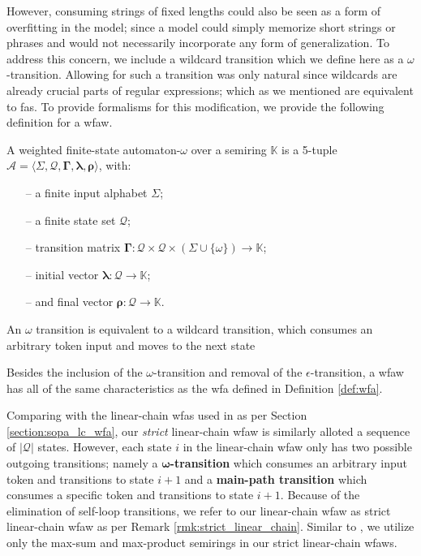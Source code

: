 However, consuming strings of fixed lengths could also be seen as a form of
overfitting in the model; since a model could simply memorize short strings or
phrases and would not necessarily incorporate any form of generalization. To
address this concern, we include a wildcard transition which we define here as a
$\omega$-transition. Allowing for such a transition was only natural since
wildcards are already crucial parts of regular expressions; which as we
mentioned are equivalent to \ac{fas}. To provide formalisms for this modification, we
provide the following definition for a \ac{wfaw}.

\begin{definition}
  \label{def:wfa_w}
  A weighted finite-state automaton-$\omega$ over a semiring $\mathbb{K}$ is a
  5-tuple $\mathcal{A} = \langle \Sigma, \mathcal{Q}, \bm{\Gamma}, \bm{\lambda}, \bm{\rho}
  \rangle$, with:

  \begin{itemize}
  \itemsep0em
    \item[--] a finite input alphabet $\Sigma$;
    \item[--] a finite state set $\mathcal{Q}$;
    \item[--] transition matrix $\bm{\Gamma}: \mathcal{Q} \times \mathcal{Q} \times (\Sigma \cup \{\omega\}) \rightarrow \mathbb{K}$;
    \item[--] initial vector $\bm{\lambda}: \mathcal{Q} \rightarrow \mathbb{K}$;
    \item[--] and final vector $\bm{\rho}: \mathcal{Q} \rightarrow \mathbb{K}$.
  \end{itemize}

  \begin{remark}
    An $\omega$ transition is equivalent to a wildcard transition, which
    consumes an arbitrary token input and moves to the next state
  \end{remark}

  \begin{remark}
    Besides the inclusion of the $\omega$-transition and removal of the
    $\epsilon$-transition, a \ac{wfaw} has all of the same characteristics
    as the \ac{wfa} defined in Definition \ref{def:wfa}.
  \end{remark}
\end{definition}

Comparing with the linear-chain \ac{wfas} used in \citet{schwartz2018sopa} as per
Section \ref{section:sopa_lc_wfa}, our \textit{strict} linear-chain \ac{wfaw}
is similarly alloted a sequence of $|\mathcal{Q}|$ states. However, each state
$i$ in the linear-chain \ac{wfaw} only has two possible outgoing transitions;
namely a \textbf{$\bm{\omega}$-transition} which consumes an arbitrary input
token and transitions to state $i+1$ and a \textbf{main-path transition} which
consumes a specific token and transitions to state $i+1$. Because of the
elimination of self-loop transitions, we refer to our linear-chain \ac{wfaw}
as strict linear-chain \ac{wfaw} as per Remark
\ref{rmk:strict_linear_chain}. Similar to \citet{schwartz2018sopa}, we utilize
only the max-sum and max-product semirings in our strict linear-chain
\ac{wfaws}.


